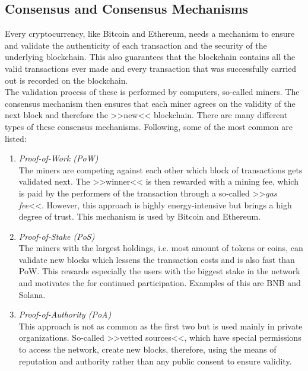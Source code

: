 \documentclass[a4paper,12pt]{report}
\begin{document}
	    \subsection[Consensus and Consensus Mechanisms]{Consensus and Consensus Mechanisms \parencite{ER21}} \label{ConsMechs}
	    \startsubsection
	        Every cryptocurrency, like Bitcoin and Ethereum, needs a mechanism to ensure and validate the authenticity of each transaction and the security of the underlying blockchain. This also guarantees that the blockchain contains all the valid transactions ever made and every transaction that was successfully carried out is recorded on the blockchain. \\
	        The validation process of these is performed by computers, so-called miners. The consensus mechanism then ensures that each miner agrees on the validity of the next block and therefore the >>new<< blockchain. There are many different types of these consensus mechanisms. Following, some of the most common are listed:
	        \begin{enumerate}
	            \item \textit{Proof-of-Work (PoW)} \\
	            The miners are competing against each other which block of transactions gets validated next. The >>winner<< is then rewarded with a mining fee, which is paid by the performers of the transaction through a so-called >>\textit{gas fee}<<. However, this approach is highly energy-intensive but brings a high degree of trust. This mechanism is used by Bitcoin and Ethereum.
	            \item \textit{Proof-of-Stake (PoS)} \\
	            The miners with the largest holdings, i.e. most amount of tokens or coins, can validate new blocks which lessens the transaction costs and is also fast than PoW. This rewards especially the users with the biggest stake in the network and motivates the for continued participation. Examples of this are BNB and Solana.
	            \item \textit{Proof-of-Authority (PoA)} \\
	            This approach is not as common as the first two but is used mainly in private organizations. So-called >>vetted sources<<, which have special permissions to access the network, create new blocks, therefore, using the means of reputation and authority rather than any public consent to ensure validity.
	        \end{enumerate}
	    \closesection
	\closesection
	
\end{document}
